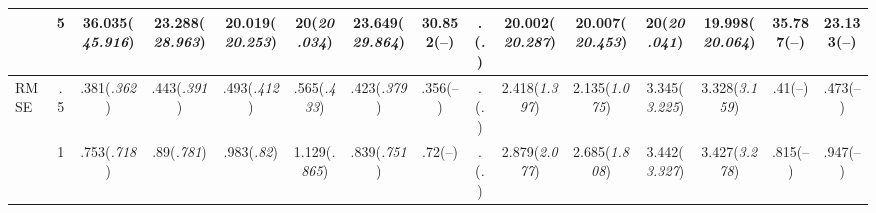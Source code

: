 \documentclass{article}
\begin{document}
\begin{table}[tbp]
{\begin{tabularx}{\textwidth}{lCCCCCCCCCCCCCC}
&5&36.035\newline (\emph{45.916})&23.288\newline (\emph{28.963})&20.019\newline (\emph{20.253})&20\newline (\emph{20.034})&23.649\newline (\emph{29.864})&30.852\newline (--)&.\newline (\emph{.})&20.002\newline (\emph{20.287})&20.007\newline (\emph{20.453})&20\newline (\emph{20.041})&19.998\newline (\emph{20.064})&35.787\newline (--)&23.133\newline (--) \tabularnewline
\midrule RMSE&.5&.381\newline (\emph{.362})&.443\newline (\emph{.391})&.493\newline (\emph{.412})&.565\newline (\emph{.433})&.423\newline (\emph{.379})&.356\newline (--)&.\newline (\emph{.})&2.418\newline (\emph{1.397})&2.135\newline (\emph{1.075})&3.345\newline (\emph{3.225})&3.328\newline (\emph{3.159})&.41\newline (--)&.473\newline (--) \tabularnewline
&1&.753\newline (\emph{.718})&.89\newline (\emph{.781})&.983\newline (\emph{.82})&1.129\newline (\emph{.865})&.839\newline (\emph{.751})&.72\newline (--)&.\newline (\emph{.})&2.879\newline (\emph{2.077})&2.685\newline (\emph{1.808})&3.442\newline (\emph{3.327})&3.427\newline (\emph{3.278})&.815\newline (--)&.947\newline (--) \tabularnewline

\end{tabularx}}
\end{table}
\end{document}
